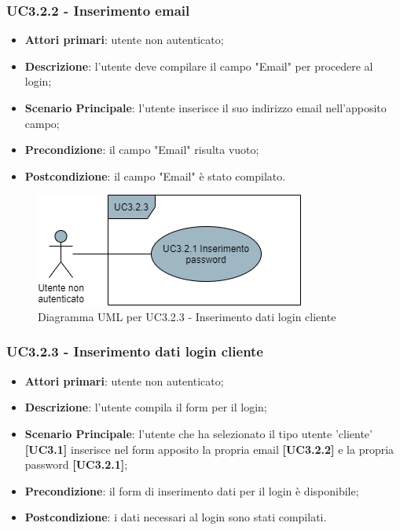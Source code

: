 \subsubsection{UC3.2.2 - Inserimento email}
\begin{itemize}
\item \textbf{Attori primari}: utente non autenticato;
\item \textbf{Descrizione}: l'utente deve compilare il campo "Email" per procedere al login;
\item \textbf{Scenario Principale}: l'utente inserisce il suo indirizzo email nell'apposito campo;
\item \textbf{Precondizione}: il campo "Email" risulta vuoto;
\item \textbf{Postcondizione}: il campo "Email" è stato compilato.
\end{itemize}

\begin{figure}[H]
\centering
\includegraphics[scale=0.6]{res/UseCase/Immagini/InserimentoDatiLoginCliente}
\caption{Diagramma UML per UC3.2.3 - Inserimento dati login cliente}
\end{figure}

\subsubsection{UC3.2.3 - Inserimento dati login cliente}
\begin{itemize}
\item \textbf{Attori primari}: utente non autenticato;
\item \textbf{Descrizione}: l'utente compila il form per il login;
\item \textbf{Scenario Principale}: l'utente che ha selezionato il tipo utente 'cliente' \textbf{[UC3.1]} inserisce nel form apposito la propria email \textbf{[UC3.2.2]} e la propria password \textbf{[UC3.2.1]};
\item \textbf{Precondizione}: il form di inserimento dati per il login è disponibile;
\item \textbf{Postcondizione}: i dati necessari al login sono stati compilati.
\end{itemize}

